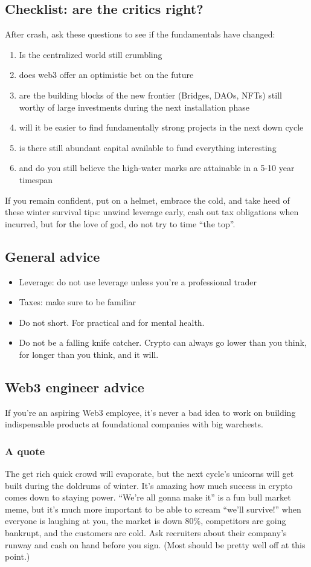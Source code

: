 \documentclass{../notes}
\begin{document}
\subsection{Checklist: are the critics right?}
After crash, ask these questions to see if the fundamentals have changed: 
\begin{enumerate}
    \item Is the centralized world still crumbling
    \item does web3 offer an optimistic bet on the future 
    \item are the building blocks of the new frontier (Bridges, DAOs, NFTs) still worthy of large investments during the next installation phase
    \item will it be easier to find fundamentally strong projects in the next down cycle
    \item is there still abundant capital available to fund everything interesting
    \item and do you still believe the high-water marks are attainable in a 5-10 year timespan
\end{enumerate}
If you remain confident, put on a helmet, embrace the cold, and take heed of these winter survival tips: unwind leverage early, cash out tax obligations when incurred, but for the love of god, do not try to time “the top”.
\subsection{General advice}
\begin{itemize}
    \item Leverage: do not use leverage unless you're a professional trader
    \item Taxes: make sure to be familiar
    \item Do not short. For practical and for mental health. 
    \item Do not be a falling knife catcher. Crypto can always go lower than you think, for longer than you think, and it will. 
\end{itemize}
\subsection{Web3 engineer advice}
If you’re an aspiring Web3 employee, it’s never a bad idea to work on building indispensable products at foundational companies with big warchests.

\subsubsection{A quote}
The get rich quick crowd will evaporate, but the next cycle’s unicorns will get built during the doldrums of winter. It’s amazing how much success in crypto comes down to staying power. “We’re all gonna make it” is a fun bull market meme, but it’s much more important to be able to scream “we’ll survive!” when everyone is laughing at you, the market is down 80\%, competitors are going bankrupt, and the customers are cold. Ask recruiters about their company’s runway and cash on hand before you sign. (Most should be pretty well off at this point.)
\end{document}

